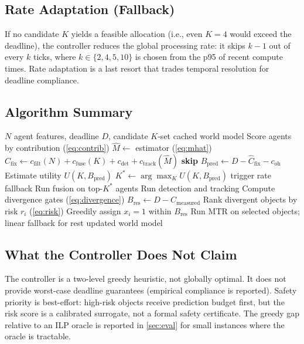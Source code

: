\subsection{Rate Adaptation (Fallback)}

If no candidate $K$ yields a feasible allocation (i.e., even $K=4$
would exceed the deadline), the controller reduces the global
processing rate: it skips $k-1$ out of every $k$ ticks, where
$k \in \{2, 4, 5, 10\}$ is chosen from the p95 of recent compute
times.  Rate adaptation is a last resort that trades temporal
resolution for deadline compliance.

\subsection{Algorithm Summary}

\begin{algorithm}[t]
\caption{Adaptive controller (per tick)}
\label{alg:controller}
\begin{algorithmic}[1]
\Require $N$ agent features, deadline $D$, candidate $K$-set
  \State \Return cached world model
\EndIf
\State Score agents by contribution (\cref{eq:contrib})
  \State $\hat{M} \gets$ estimator (\cref{eq:mhat})
  \State $\hat{C}_{\mathrm{fix}} \gets c_{\mathrm{filt}}(N) + c_{\mathrm{fuse}}(K) + c_{\mathrm{det}} + c_{\mathrm{track}}(\hat{M})$
   \textbf{skip} \EndIf
  \State $B_{\mathrm{pred}} \gets D - \hat{C}_{\mathrm{fix}} - c_{\mathrm{oh}}$
  \State Estimate utility $U(K, B_{\mathrm{pred}})$
\EndFor
\State $K^* \gets \arg\max_K U(K, B_{\mathrm{pred}})$
 trigger rate fallback \EndIf
\State Run fusion on top-$K^*$ agents
\State Run detection and tracking
\State Compute divergence gates (\cref{eq:divergence})
\State $B_{\mathrm{res}} \gets D - C_{\mathrm{measured}}$ 
\State Rank divergent objects by risk $r_i$ (\cref{eq:risk})
\State Greedily assign $x_i{=}1$ within $B_{\mathrm{res}}$
\State Run MTR on selected objects; linear fallback for rest
\State \Return updated world model
\end{algorithmic}
\end{algorithm}

\subsection{What the Controller Does Not Claim}

The controller is a two-level greedy heuristic, not globally optimal.
It does not provide worst-case deadline guarantees (empirical
compliance is reported).  Safety priority is best-effort: high-risk
objects receive prediction budget first, but the risk score is a
calibrated surrogate, not a formal safety certificate.
The greedy gap relative to an ILP oracle is reported in
\cref{sec:eval} for small instances where the oracle is tractable.
